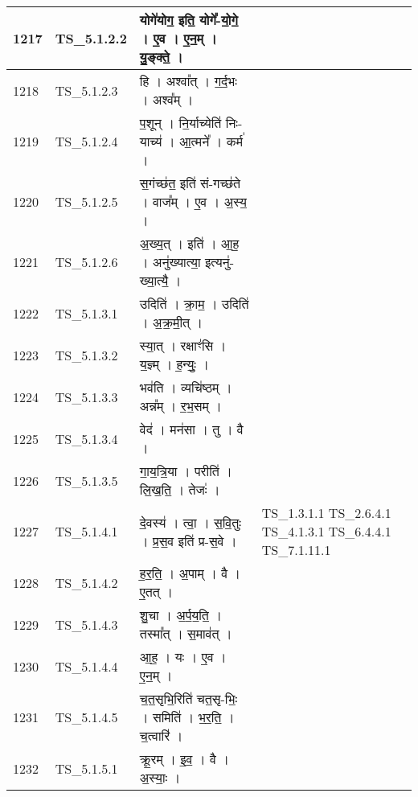\documentclass[17pt]{extarticle}
\begin{document}
\begin{longtable}{||p{0.4in}||p{0.9in}||p{4.0in}||p{0.9in}||}
        \hline
            1217 & TS\_5.1.2.2 & योगे॑योग॒ इति॒ योगे᳚{-}यो॒गे॒   ।   ए॒व   ।   ए॒न॒म्   ।   यु॒ङ्क्ते॒   ।    &      \\
        \hline
            1218 & TS\_5.1.2.3 & हि   ।   अश्वा᳚त्   ।   ग॒र्द॒भः   ।   अश्व᳚म्   ।    &      \\
        \hline
            1219 & TS\_5.1.2.4 & प॒शून्   ।   नि॒र्याच्येति॑ निः{-}याच्य॑   ।   आ॒त्मने᳚   ।   कर्म॑   ।    &      \\
        \hline
            1220 & TS\_5.1.2.5 & स॒गंच्छ॑त॒ इति॑ सं{-}गच्छ॑ते   ।   वाज᳚म्   ।   ए॒व   ।   अ॒स्य॒   ।    &      \\
        \hline
            1221 & TS\_5.1.2.6 & अ॒ख्य॒त्   ।   इति॑   ।   आ॒ह॒   ।   अनु॑ख्यात्या॒ इत्यनु॑{-}ख्या॒त्यै॒   ।    &      \\
        \hline
            1222 & TS\_5.1.3.1 & उदिति॑   ।   क्रा॒म॒   ।   उदिति॑   ।   अ॒क्र॒मी॒त्   ।    &      \\
        \hline
            1223 & TS\_5.1.3.2 & स्या॒त्   ।   रक्षाꣳ॑सि   ।   य॒ज्ञ्म्   ।   ह॒न्युः॒   ।    &      \\
        \hline
            1224 & TS\_5.1.3.3 & भव॑ति   ।   व्यचि॑ष्ठम्   ।   अन्न᳚म्   ।   र॒भ॒सम्   ।    &      \\
        \hline
            1225 & TS\_5.1.3.4 & वेद॑   ।   मन॑सा   ।   तु   ।   वै   ।    &      \\
        \hline
            1226 & TS\_5.1.3.5 & गा॒य॒त्रि॒या   ।   परीति॑   ।   लि॒ख॒ति॒   ।   तेजः॑   ।    &      \\
        \hline
            1227 & TS\_5.1.4.1 & दे॒वस्य॑   ।   त्वा॒   ।   स॒वि॒तुः   ।   प्र॒स॒व इति॑ प्र{-}स॒वे   ।    & TS\_1.3.1.1 TS\_2.6.4.1 TS\_4.1.3.1  TS\_6.4.4.1 TS\_7.1.11.1       \\
        \hline
            1228 & TS\_5.1.4.2 & ह॒र॒ति॒   ।   अ॒पाम्   ।   वै   ।   ए॒तत्   ।    &      \\
        \hline
            1229 & TS\_5.1.4.3 & शु॒चा   ।   अ॒र्प॒य॒ति॒   ।   तस्मा᳚त्   ।   स॒माव॑त्   ।    &      \\
        \hline
            1230 & TS\_5.1.4.4 & आ॒ह॒   ।   यः   ।   ए॒व   ।   ए॒न॒म्   ।    &      \\
        \hline
            1231 & TS\_5.1.4.5 & च॒त॒सृभि॒रिति॑ चत॒सृ{-}भिः॒   ।   समिति॑   ।   भ॒र॒ति॒   ।   च॒त्वारि॑   ।    &      \\
        \hline
            1232 & TS\_5.1.5.1 & क्रू॒रम्   ।   इ॒व॒   ।   वै   ।   अ॒स्याः॒   ।    &      \\

\end{longtable}
\end{document}
